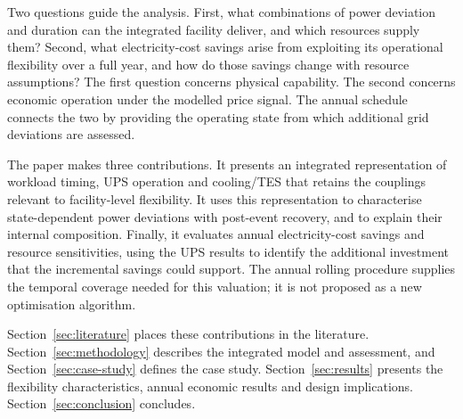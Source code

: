 Two questions guide the analysis. First, what combinations of power deviation and duration can the integrated facility deliver, and which resources supply them? Second, what electricity-cost savings arise from exploiting its operational flexibility over a full year, and how do those savings change with resource assumptions? The first question concerns physical capability. The second concerns economic operation under the modelled price signal. The annual schedule connects the two by providing the operating state from which additional grid deviations are assessed.

The paper makes three contributions. It presents an integrated representation of workload timing, UPS operation and cooling/TES that retains the couplings relevant to facility-level flexibility. It uses this representation to characterise state-dependent power deviations with post-event recovery, and to explain their internal composition. Finally, it evaluates annual electricity-cost savings and resource sensitivities, using the UPS results to identify the additional investment that the incremental savings could support. The annual rolling procedure supplies the temporal coverage needed for this valuation; it is not proposed as a new optimisation algorithm.

Section~\ref{sec:literature} places these contributions in the literature. Section~\ref{sec:methodology} describes the integrated model and assessment, and Section~\ref{sec:case-study} defines the case study. Section~\ref{sec:results} presents the flexibility characteristics, annual economic results and design implications. Section~\ref{sec:conclusion} concludes.
